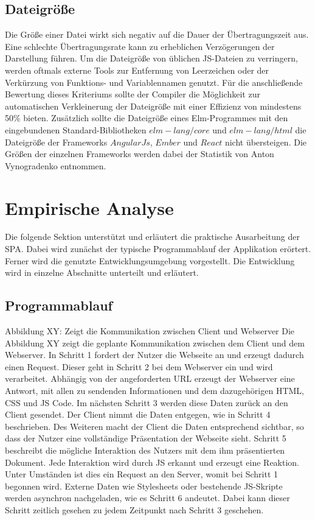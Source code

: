 \subsection{Dateigröße}
\label{sec:muster_dateigroesse}
Die Größe einer Datei wirkt sich negativ auf die Dauer der Übertragungszeit aus. Eine schlechte Übertragungsrate kann zu erheblichen Verzögerungen der Darstellung führen. Um die Dateigröße von üblichen \ac{JS}-Dateien zu verringern, werden oftmals externe Tools zur Entfernung von Leerzeichen oder der Verkürzung von Funktions- und Variablennamen genutzt. Für die anschließende Bewertung dieses Kriteriums sollte der Compiler die Möglichkeit zur automatischen Verkleinerung der Dateigröße mit einer Effizienz von mindestens 50\% bieten. Zusätzlich sollte die Dateigröße eines Elm-Programmes mit den eingebundenen Standard-Bibliotheken $elm-lang/core$ und $elm-lang/html$ die Dateigröße der Frameworks $AngularJs$, $Ember$ und $React$ nicht übersteigen. Die Größen der einzelnen Frameworks werden dabei der Statistik von Anton Vynogradenko \cite[Vgl.]{framework-sizes} entnommen.

\newpage
\section{Empirische Analyse}
\label{sec:Empirische Analyse}
Die folgende Sektion unterstützt und erläutert die praktische Ausarbeitung der \ac{SPA}. Dabei wird zunächst der typische Programmablauf der Applikation erörtert. Ferner wird die genutzte Entwicklungsumgebung vorgestellt. Die Entwicklung wird in einzelne Abschnitte unterteilt und erläutert.

\subsection{Programmablauf}
\label{sec:Programmablauf}
Abbildung XY: Zeigt die Kommunikation zwischen Client und Webserver
Die Abbildung XY zeigt die geplante Kommunikation zwischen dem Client und dem Webserver.
In Schritt 1 fordert der Nutzer die Webseite an und erzeugt dadurch einen Request. Dieser geht in Schritt 2 bei dem Webserver ein und wird verarbeitet. Abhängig von der angeforderten URL erzeugt der Webserver eine Antwort, mit allen zu sendenden Informationen und dem dazugehörigen \ac{HTML}, \ac{CSS} und \ac{JS} Code. Im nächsten Schritt 3 werden diese Daten zurück an den Client gesendet. Der Client nimmt die Daten entgegen, wie in Schritt 4 beschrieben. Des Weiteren macht der Client die Daten entsprechend sichtbar, so dass der Nutzer eine vollständige Präsentation der Webseite sieht. Schritt 5 beschreibt die mögliche Interaktion des Nutzers mit dem ihm präsentierten Dokument. Jede Interaktion wird durch \ac{JS} erkannt und erzeugt eine Reaktion. Unter Umständen ist dies ein Request an den Server, womit bei Schritt 1 begonnen wird. Externe Daten wie Stylesheets oder bestehende \ac{JS}-Skripte  werden asynchron nachgeladen, wie es Schritt 6 andeutet. Dabei kann dieser Schritt zeitlich gesehen zu jedem Zeitpunkt nach Schritt 3 geschehen.


